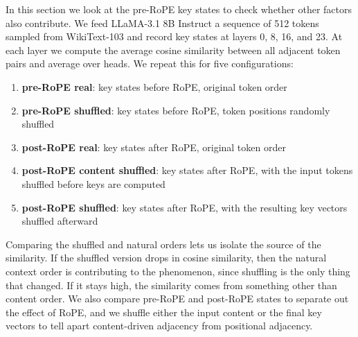 In this section we look at the pre-RoPE key states to check whether other factors also contribute.
We feed LLaMA-3.1 8B Instruct a sequence of 512 tokens sampled from WikiText-103 and record key states at layers 0, 8, 16, and 23.
At each layer we compute the average cosine similarity between all adjacent token pairs and average over heads.
We repeat this for five configurations:

\begin{enumerate}
    \item \textbf{pre-RoPE real}: key states before RoPE, original token order
    \item \textbf{pre-RoPE shuffled}: key states before RoPE, token positions randomly shuffled
    \item \textbf{post-RoPE real}: key states after RoPE, original token order
    \item \textbf{post-RoPE content shuffled}: key states after RoPE, with the input tokens shuffled before keys are computed
    \item \textbf{post-RoPE shuffled}: key states after RoPE, with the resulting key vectors shuffled afterward
\end{enumerate}

Comparing the shuffled and natural orders lets us isolate the source of the similarity. If the shuffled version drops in cosine similarity, then the natural context order is contributing to the phenomenon, since shuffling is the only thing that changed. If it stays high, the similarity comes from something other than content order. We also compare pre-RoPE and post-RoPE states to separate out the effect of RoPE, and we shuffle either the input content or the final key vectors to tell apart content-driven adjacency from positional adjacency.

